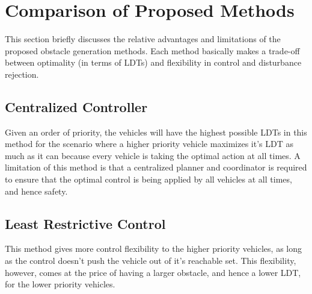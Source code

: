 %

\section{Comparison of Proposed Methods}
This section briefly discusses the relative advantages and limitations of the proposed obstacle generation methods. Each method basically makes a trade-off between optimality (in terms of LDTs) and flexibility in control and disturbance rejection.

\subsection{Centralized Controller}
Given an order of priority, the vehicles will have the highest possible LDTs in this method for the scenario where a higher priority vehicle maximizes it's LDT as much as it can because every vehicle is taking the optimal action at all times. 
A limitation of this method is that a centralized planner and coordinator is required to ensure that the optimal control is being applied by all vehicles at all times, and hence safety.

\subsection{Least Restrictive Control}
This method gives more control flexibility to the higher priority vehicles, as long as the control doesn't push the vehicle out of it's reachable set. This flexibility, however, comes at the price of having a larger obstacle, and hence a lower LDT, for the lower priority vehicles.  

